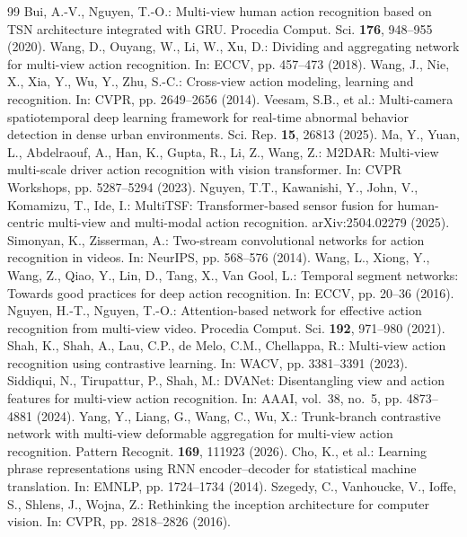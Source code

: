 \documentclass[runningheads]{llncs}
\begin{document}
\begin{thebibliography}{99}
 Bui, A.-V., Nguyen, T.-O.: Multi-view human action recognition based on TSN architecture integrated with GRU. Procedia Comput. Sci. \textbf{176}, 948--955 (2020).
 Wang, D., Ouyang, W., Li, W., Xu, D.: Dividing and aggregating network for multi-view action recognition. In: ECCV, pp. 457--473 (2018).
 Wang, J., Nie, X., Xia, Y., Wu, Y., Zhu, S.-C.: Cross-view action modeling, learning and recognition. In: CVPR, pp. 2649--2656 (2014).
 Veesam, S.B., et al.: Multi-camera spatiotemporal deep learning framework for real-time abnormal behavior detection in dense urban environments. Sci. Rep. \textbf{15}, 26813 (2025).
 Ma, Y., Yuan, L., Abdelraouf, A., Han, K., Gupta, R., Li, Z., Wang, Z.: M2DAR: Multi-view multi-scale driver action recognition with vision transformer. In: CVPR Workshops, pp. 5287--5294 (2023).
 Nguyen, T.T., Kawanishi, Y., John, V., Komamizu, T., Ide, I.: MultiTSF: Transformer-based sensor fusion for human-centric multi-view and multi-modal action recognition. arXiv:2504.02279 (2025).
 Simonyan, K., Zisserman, A.: Two-stream convolutional networks for action recognition in videos. In: NeurIPS, pp. 568--576 (2014).
 Wang, L., Xiong, Y., Wang, Z., Qiao, Y., Lin, D., Tang, X., Van Gool, L.: Temporal segment networks: Towards good practices for deep action recognition. In: ECCV, pp. 20--36 (2016).
 Nguyen, H.-T., Nguyen, T.-O.: Attention-based network for effective action recognition from multi-view video. Procedia Comput. Sci. \textbf{192}, 971--980 (2021).
 Shah, K., Shah, A., Lau, C.P., de Melo, C.M., Chellappa, R.: Multi-view action recognition using contrastive learning. In: WACV, pp. 3381--3391 (2023).
 Siddiqui, N., Tirupattur, P., Shah, M.: DVANet: Disentangling view and action features for multi-view action recognition. In: AAAI, vol.~38, no.~5, pp. 4873--4881 (2024).
 Yang, Y., Liang, G., Wang, C., Wu, X.: Trunk-branch contrastive network with multi-view deformable aggregation for multi-view action recognition. Pattern Recognit. \textbf{169}, 111923 (2026).
 Cho, K., et al.: Learning phrase representations using RNN encoder--decoder for statistical machine translation. In: EMNLP, pp. 1724--1734 (2014).
 Szegedy, C., Vanhoucke, V., Ioffe, S., Shlens, J., Wojna, Z.: Rethinking the inception architecture for computer vision. In: CVPR, pp. 2818--2826 (2016).

\end{thebibliography}
\end{document}
